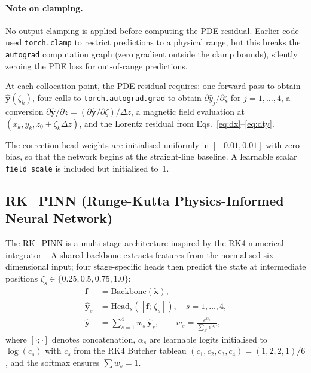 \documentclass[a4paper,11pt]{article}
\newcommand{\dz}{\Delta z}
\begin{document}
\paragraph{Note on clamping.}
No output clamping is applied before computing the PDE residual.
Earlier code used \texttt{torch.clamp} to restrict predictions to a
physical range, but this breaks the \texttt{autograd} computation graph
(zero gradient outside the clamp bounds), silently zeroing the PDE loss
for out-of-range predictions.

At each collocation point, the PDE residual requires: one forward pass to
obtain $\hat{\mathbf{y}}(\zeta_k)$, four calls to
\texttt{torch.autograd.grad} to obtain $\partial\hat{y}_j/\partial\zeta$
for $j = 1, \ldots, 4$, a conversion
$\partial\hat{\mathbf{y}}/\partial z = (\partial\hat{\mathbf{y}}/\partial\zeta) / \dz$,
a magnetic field evaluation at
$(x_k, y_k, z_0 + \zeta_k \dz)$, and the Lorentz residual from
Eqs.~\eqref{eq:dx}--\eqref{eq:dty}.

The correction head weights are initialised uniformly in $[-0.01, 0.01]$
with zero bias, so that the network begins at the straight-line baseline.
A learnable scalar \texttt{field\_scale} is included but initialised to~1.

\subsection{RK\_PINN (Runge-Kutta Physics-Informed Neural Network)}
\label{sec:rkpinn}

The RK\_PINN is a multi-stage architecture inspired by the RK4 numerical
integrator~\cite{Stiasny2021, Zhai2023}.  A shared backbone extracts
features from the normalised six-dimensional input; four stage-specific
heads then predict the state at intermediate positions
$\zeta_s \in \{0.25, 0.5, 0.75, 1.0\}$:
\begin{align}
  \mathbf{f} &= \text{Backbone}(\tilde{\mathbf{x}}), \label{eq:rk_backbone} \\
  \hat{\mathbf{y}}_s &= \text{Head}_s([\mathbf{f};\, \zeta_s]),
    \quad s = 1, \ldots, 4, \label{eq:rk_heads} \\
  \hat{\mathbf{y}} &= \sum_{s=1}^{4} w_s\, \hat{\mathbf{y}}_s,
    \qquad w_s = \frac{e^{\alpha_s}}{\sum_{s'} e^{\alpha_{s'}}},
    \label{eq:rk_weights}
\end{align}
where $[\cdot;\cdot]$ denotes concatenation, $\alpha_s$ are learnable
logits initialised to $\log(c_s)$ with $c_s$ from the RK4 Butcher
tableau $(c_1, c_2, c_3, c_4) = (1, 2, 2, 1)/6$, and the softmax
ensures $\sum w_s = 1$.
\end{document}
